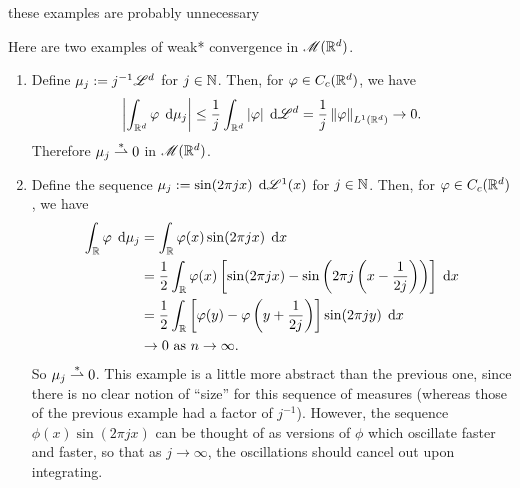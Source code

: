 {\color{red} these examples are probably unnecessary}
\begin{example}
    Here are two examples of weak* convergence in $\mathscr{M}(\mathbb{R}^d)$.
    \begin{enumerate}[label=(\arabic*)]
        \item Define $\mu_j := j^{-1} \mathscr{L}^d$ for $j \in \mathbb{N}$. Then, for $\varphi \in C_c(\mathbb{R}^d)$, we have
            \begin{equation}
                \left\vert {\int_{\mathbb{R}^d} \varphi\; \ensuremath{\operatorname{d}\!{\mu}}_j} \right\vert \leq \frac{1}{j} \int_{\mathbb{R}^d} \left\vert {\varphi} \right\vert \; \operatorname{d}\!{\mathscr{L}}^d = \frac{1}{j} \left\Vert {\varphi} \right\Vert_{L^1(\mathbb{R}^d)} \rightarrow 0.
            \end{equation}
            Therefore $\mu_j \overset{\ast}{\rightharpoonup} 0$ in $\mathscr{M}(\mathbb{R}^d)$.
        
        \item Define the sequence $\mu_j := \sin(2 \pi j x) \; \operatorname{d}\!{\mathscr{L}}^1(x)$ for $j \in \mathbb{N}$. Then, for $\varphi \in C_c(\mathbb{R}^d)$, we have
            \begin{equation} \begin{aligned}
                \int_{\mathbb{R}} \varphi \; \operatorname{d}\!{\mu}_j &= \int_{\mathbb{R}} \varphi(x) \sin(2\pi j x) \; \operatorname{d}\!{x}                                                                     \\
                                               &= \frac{1}{2} \int_{\mathbb{R}} \varphi(x) \left[\sin(2\pi j x) - \sin\left(2\pi j \left(x - \frac{1}{2j}\right)\right)      \right] \; \operatorname{d}\!{x} \\
                                               &= \frac{1}{2} \int_{\mathbb{R}} \left[ \varphi(y) - \varphi\left(y + \frac{1}{2j}\right)\right] \sin(2 \pi j y) \; \operatorname{d}\!{x}      \\
                                               &\rightarrow 0 \text{ as } n \rightarrow \infty.
            \end{aligned} \end{equation}
            So $\mu_j \overset{\ast}{\rightharpoonup} 0$. This example is a little more abstract than the previous one, since there is no clear notion of ``size'' for this sequence of measures (whereas those of the previous example had a factor of $j^{-1}$). However, the sequence $\phi(x) \sin(2\pi jx)$ can be thought of as versions of $\phi$ which oscillate faster and faster, so that as $j \rightarrow \infty$, the oscillations should cancel out upon integrating.
    \end{enumerate}
\end{example}

